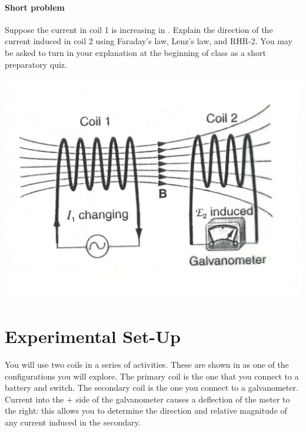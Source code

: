 \begin{multicols}{2}
\paragraph{Short problem}
Suppose the current in coil 1 is increasing in .  Explain the direction of the current induced in coil 2 using Faraday's law, Lenz's law, and RHR-2.  You may be asked to turn in your explanation at the beginning of class as a short preparatory quiz.


\begin{center}
	\includegraphics[scale=0.8]{5bgraf/fig_12}
	\label{f:fig12}
\end{center}

\section{Experimental Set-Up}
You will use two coils in a series of activities.  These are shown in  as one of the configurations you will explore.  The primary coil is the one that you connect to a battery and switch.  The secondary coil is the one you connect to a galvanometer.  Current into the + side of the galvanometer causes a deflection of the meter to the right: this allows you to determine the direction and relative magnitude of any current induced in the secondary.



\end{multicols}

